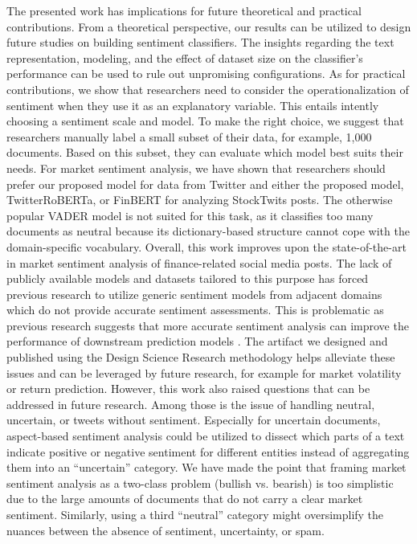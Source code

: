 The presented work has implications for future theoretical and practical contributions. From a theoretical perspective, our results can be utilized to design future studies on building sentiment classifiers. The insights regarding the text representation, modeling, and the effect of dataset size on the classifier's performance can be used to rule out unpromising configurations.
 As for practical contributions, we show that researchers need to consider the operationalization of sentiment when they use it as an explanatory variable. This entails intently choosing a sentiment scale and model. To make the right choice, we suggest that researchers manually label a small subset of their data, for example, 1,000 documents. Based on this subset, they can evaluate which model best suits their needs. For market sentiment analysis, we have shown that researchers should prefer our proposed model for data from Twitter and either the proposed model, TwitterRoBERTa, or FinBERT for analyzing StockTwits posts. The otherwise popular VADER model is not suited for this task, as it classifies too many documents as neutral because its dictionary-based structure cannot cope with the domain-specific vocabulary.\newline
Overall, this work improves upon the state-of-the-art in market sentiment analysis of finance-related social media posts. The lack of publicly available models and datasets tailored to this purpose has forced previous research to utilize generic sentiment models from adjacent domains which do not provide accurate sentiment assessments. This is problematic as previous research suggests that more accurate sentiment analysis can improve the performance of downstream prediction models . The artifact we designed and published using the Design Science Research methodology helps alleviate these issues and can be leveraged by future research, for example for market volatility or return prediction.\newline
However, this work also raised questions that can be addressed in future research. Among those is the issue of handling neutral, uncertain, or tweets without sentiment. Especially for uncertain documents, aspect-based sentiment analysis could be utilized to dissect which parts of a text indicate positive or negative sentiment for different entities instead of aggregating them into an ``uncertain'' category. We have made the point that framing market sentiment analysis as a two-class problem (bullish vs. bearish) is too simplistic due to the large amounts of documents that do not carry a clear market sentiment. Similarly, using a third ``neutral'' category might oversimplify the nuances between the absence of sentiment, uncertainty, or spam.
